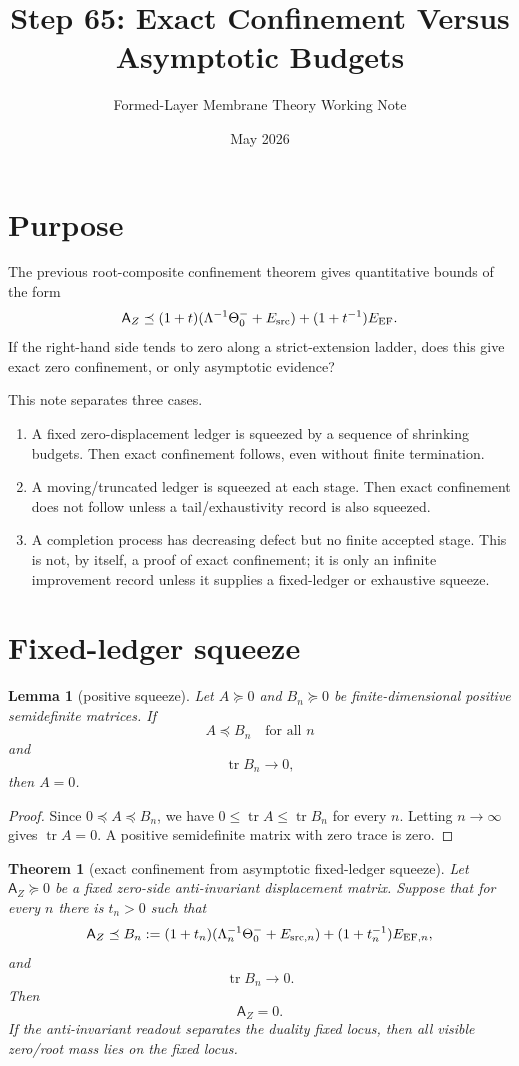 \documentclass[11pt]{article}
\title{Step 65: Exact Confinement Versus Asymptotic Budgets}
\author{Formed-Layer Membrane Theory Working Note}
\date{May 2026}
\newtheorem{theorem}{Theorem}
\newtheorem{lemma}{Lemma}
\newcommand{\AZ}{\mathsf A_Z}
\newcommand{\tr}{\operatorname{tr}}
\begin{document}
\maketitle

\section{Purpose}
The previous root-composite confinement theorem gives quantitative bounds of the form
\[
  \AZ \preceq
  (1+t)(\Lambda^{-1}\Theta_0^-+E_{\rm src})
  +(1+t^{-1})E_{\rm EF}.
\]
If the right-hand side tends to zero along a strict-extension ladder, does this give exact zero confinement, or only asymptotic evidence?

This note separates three cases.
\begin{enumerate}[label=(\roman*)]
\item A fixed zero-displacement ledger is squeezed by a sequence of shrinking budgets. Then exact confinement follows, even without finite termination.
\item A moving/truncated ledger is squeezed at each stage. Then exact confinement does not follow unless a tail/exhaustivity record is also squeezed.
\item A completion process has decreasing defect but no finite accepted stage. This is not, by itself, a proof of exact confinement; it is only an infinite improvement record unless it supplies a fixed-ledger or exhaustive squeeze.
\end{enumerate}

\section{Fixed-ledger squeeze}

\begin{lemma}[positive squeeze]
Let $A\succeq0$ and $B_n\succeq0$ be finite-dimensional positive semidefinite matrices. If
\[
  A\preceq B_n\quad\text{for all }n
\]
and
\[
  \tr B_n\to0,
\]
then $A=0$.
\end{lemma}

\begin{proof}
Since $0\preceq A\preceq B_n$, we have $0\le \tr A\le \tr B_n$ for every $n$. Letting $n\to\infty$ gives $\tr A=0$. A positive semidefinite matrix with zero trace is zero.
\end{proof}

\begin{theorem}[exact confinement from asymptotic fixed-ledger squeeze]
Let $\AZ\succeq0$ be a fixed zero-side anti-invariant displacement matrix. Suppose that for every $n$ there is $t_n>0$ such that
\[
  \AZ
  \preceq
  B_n
  :=(1+t_n)(\Lambda_n^{-1}\Theta_0^-+E_{{\rm src},n})
  +(1+t_n^{-1})E_{{\rm EF},n},
\]
and
\[
  \tr B_n\to0.
\]
Then
\[
  \AZ=0.
\]
If the anti-invariant readout separates the duality fixed locus, then all visible zero/root mass lies on the fixed locus.
\end{theorem}
\end{document}

